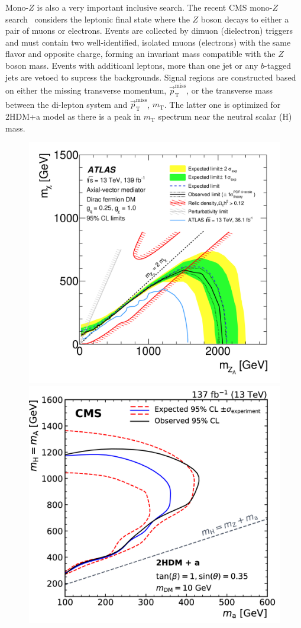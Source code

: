 \documentclass{moriond}
\def\mt{m_{\textrm{T}}}
\def\ptmiss{\vec{p}_\textrm{T}^{\textrm{miss}}}
\begin{document}
Mono-$Z$ is also a very important inclusive search. The recent CMS mono-$Z$
search~\cite{monoz} considers the leptonic final state where the $Z$ boson
decays to either a pair of muons or electrons. Events are collected by dimuon
(dielectron) triggers and must contain two well-identified, isolated muons
(electrons) with the same flavor and opposite charge, forming an invariant mass
compatible with the $Z$ boson mass. Events with additioanl leptons, more than
one jet or any $b$-tagged jets are vetoed to supress the backgrounds. Signal
regions are constructed based on either the missing transverse momentum,
$\ptmiss$, or the transverse mass between the di-lepton system and $\ptmiss$,
$\mt$. The latter one is optimized for 2HDM+a model as there is a peak in $\mt$
spectrum near the neutral scalar (H) mass. 

\begin{figure} [htb]
\begin{minipage}{0.45\linewidth}
\centerline{\includegraphics[width=0.9\linewidth]{monojet}}
\end{minipage}
\begin{minipage}{0.45\linewidth}
\centerline{\includegraphics[width=0.9\linewidth]{monoz}}

\end{minipage}
\end{figure}
\end{document}
